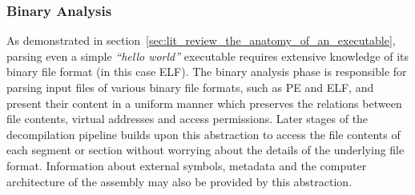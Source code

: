 
\subsubsection{Binary Analysis}
\label{sec:lit_review_binary_analysis}

As demonstrated in section~\ref{sec:lit_review_the_anatomy_of_an_executable}, parsing even a simple \textit{``hello world''} executable requires extensive knowledge of its binary file format (in this case ELF). The binary analysis phase is responsible for parsing input files of various binary file formats, such as PE and ELF, and present their content in a uniform manner which preserves the relations between file contents, virtual addresses and access permissions. Later stages of the decompilation pipeline builds upon this abstraction to access the file contents of each segment or section without worrying about the details of the underlying file format. Information about external symbols, metadata and the computer architecture of the assembly may also be provided by this abstraction.

